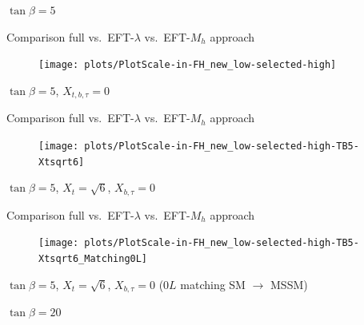 \documentclass[hyperref={pdfpagelabels=false},ngerman]{beamer}
\begin{document}
\begin{frame}[noframenumbering]
  \begin{center}
    $\tan\beta = 5$
  \end{center}
\end{frame}

\begin{frame}[noframenumbering]{Comparison full vs.\ EFT-$\lambda$ vs.\ EFT-$M_h$ approach}
  \begin{figure}
    \centering
    \texttt{[image: plots/PlotScale-in-FH\_new\_low-selected-high]}
  \end{figure}
  $\tan\beta = 5$, $X_{t,b,\tau} = 0$
\end{frame}

\begin{frame}[noframenumbering]{Comparison full vs.\ EFT-$\lambda$ vs.\ EFT-$M_h$ approach}
  \begin{figure}
    \centering
    \texttt{[image: plots/PlotScale-in-FH\_new\_low-selected-high-TB5-Xtsqrt6]}
  \end{figure}
  $\tan\beta = 5$, $X_{t} = \sqrt{6}$, $X_{b,\tau} = 0$
\end{frame}

\begin{frame}[noframenumbering]{Comparison full vs.\ EFT-$\lambda$ vs.\ EFT-$M_h$ approach}
  \begin{figure}
    \centering
    \texttt{[image: plots/PlotScale-in-FH\_new\_low-selected-high-TB5-Xtsqrt6\_Matching0L]}
  \end{figure}
  $\tan\beta = 5$, $X_{t} = \sqrt{6}$, $X_{b,\tau} = 0$ ($0L$ matching SM $\rightarrow$ MSSM)
\end{frame}


\begin{frame}[noframenumbering]
  \begin{center}
    $\tan\beta = 20$
  \end{center}
\end{frame}

\end{document}
